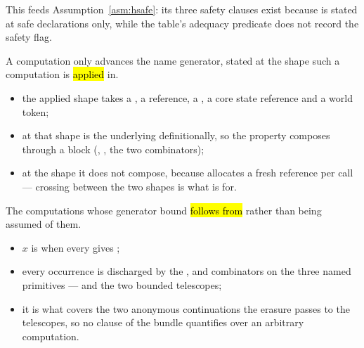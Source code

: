 \begin{remark}
 This feeds Assumption~\ref{asm:hsafe}: its three safety clauses exist because
 is stated at safe declarations only, while the table's adequacy predicate
does not record the safety flag.
\end{remark}

\begin{definition}
\label{def:MetaGenMono}
\leanok
{} A  computation only advances the name generator, stated at the
shape such a computation is \hl{applied} in.
\begin{itemize}
\item {} the applied shape takes a , a  reference, a
, a core state reference and a world token;
\item at that shape \code{>>=} is the underlying  definitionally, so the property
composes through a  block (, , the two 
combinators);
\item at the  shape it does not compose, because 
allocates a fresh  reference per call --- crossing between the two shapes is what
 is for.
\end{itemize}
\end{definition}

\begin{definition}
\label{def:PrimGenMono}
\leanok
{}
 The  computations whose generator bound \hl{follows from}
 rather than being assumed of them.
\begin{itemize}
\item {} $x$ is  when every  gives
;
\item every occurrence is discharged by the , \code{>>=} and  combinators
on the three named primitives ---  and the two bounded telescopes;
\item it is what covers the two anonymous continuations the erasure passes to the telescopes, so
no clause of the bundle quantifies over an arbitrary  computation.
\end{itemize}
\end{definition}

